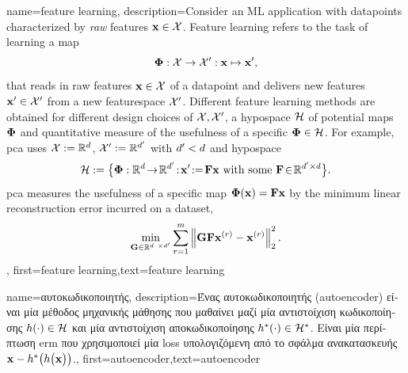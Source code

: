 {name={feature learning},
	description={Consider an ML application with \gls{datapoint}s characterized by 
		\emph{raw} \gls{feature}s ${\bf x} \in \mathcal{X}$. Feature learning 
		refers to the task of learning a map 
		$${\bf \Phi}: \mathcal{X} \rightarrow \mathcal{X}': {\bf x} \mapsto {\bf x}',$$ 
		that reads in raw \gls{feature}s ${\bf x} \in \mathcal{X}$ of a \gls{datapoint} and delivers new 
		\gls{feature}s ${\bf x}' \in \mathcal{X}'$ from a new \gls{featurespace} $\mathcal{X}'$. 
		Different \gls{feature} learning methods are obtained for different design 
		choices of $\mathcal{X},\mathcal{X}'$, a \gls{hypospace} $\mathcal{H}$ 
		of potential maps ${\bf \Phi}$ and quantitative measure of the usefulness of 
		a specific ${\bf \Phi} \in \mathcal{H}$. For example, \gls{pca} 
		uses $\mathcal{X} := \mathbb{R}^{d}$, $\mathcal{X}' := \mathbb{R}^{d'}$ 
		with $d' < d$ and \gls{hypospace} 
		$$\hypospace\defeq \big\{ \featuremapvec: \mathbb{R}^{\dimlocalmodel}
		\!\rightarrow\! \mathbb{R}^{\dimlocalmodel'}\!:\!\featurevec'\!\defeq\!\mF \featurevec \mbox{ with some } \mF \!\in\! \mathbb{R}^{\dimlocalmodel' \times \dimlocalmodel} \big\}.$$ \Gls{pca} measures the usefulness of a specific map ${\bf \Phi}({\bf x})= \mathbf{F} {\bf x}$ 
	by the minimum linear reconstruction error incurred on a \gls{dataset}, 
$$ \min_{\mG \in \mathbb{R}^{\dimlocalmodel \times \dimlocalmodel'}} \sum_{\sampleidx=1}^{\samplesize} \normgeneric{\mG \mF \featurevec^{(\sampleidx)} - \featurevec^{(\sampleidx)}}{2}^{2}.$$ }, 
	first={feature learning},text={feature learning}
} 

{name={\foreignlanguage{greek}{αυτοκωδικοποιητής}},
	description={\foreignlanguage{greek}{Ένας αυτοκωδικοποιητής} 
	(autoencoder) \foreignlanguage{greek}{είναι μία 
	μέθοδος μηχανικής μάθησης που μαθαίνει μαζί μία αντιστοίχιση κωδικοποίησης} 
	$h(\cdot) \in \mathcal{H}$ \foreignlanguage{greek}{και μία αντιστοίχιση αποκωδικοποίησης} 
	$h^{*}(\cdot) \in \mathcal{H}^{*}$. \foreignlanguage{greek}{Είναι μία περίπτωση} 
	\gls{erm} \foreignlanguage{greek}{που χρησιμοποιεί μία} \gls{loss} \foreignlanguage{greek}{υπολογιζόμενη από το σφάλμα ανακατασκευής}
	${\bf x} - h^{*}\big(  h \big( {\bf x} \big) \big)$.},
	first={autoencoder},text={autoencoder}
}

